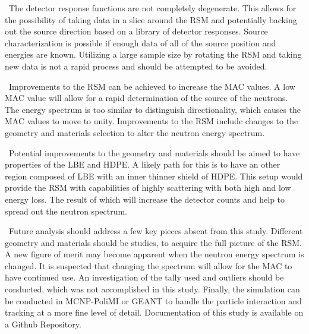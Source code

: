 \documentclass[journal]{IEEEtran}
\let\MYoriglatexcaption\caption
\renewcommand{\caption}[2][\relax]{\MYoriglatexcaption[#2]{#2}}
\begin{document}
	\ The detector response functions are not completely degenerate.  This allows for the possibility of taking data in a slice around the RSM and potentially backing out the source direction based on a library of detector responses.  Source characterization is possible if enough data of all of the source position and energies are known.  Utilizing a large sample size by rotating the RSM and taking new data is not a rapid process and should be attempted to be avoided. 
	
	\ Improvements to the RSM can be achieved to increase the MAC values.  A low MAC value will allow for a rapid determination of the source of the neutrons.  The energy spectrum is too similar to distinguish directionality, which causes the MAC values to move to unity.  Improvements to the RSM include changes to the geometry and materials selection to alter the neutron energy spectrum.  
	
	\ Potential improvements to the geometry and materials should be aimed to have properties of the LBE and HDPE.  A likely path for this is to have an other region composed of LBE with an inner thinner shield of HDPE.  This setup would provide the RSM with capabilities of highly scattering with both high and low energy loss.  The result of which will increase the detector counts and help to spread out the neutron spectrum.  
	
	\ Future analysis should address a few key pieces absent from this study.  Different geometry and materials should be studies, to acquire the full picture of the RSM. A new figure of merit may become apparent when the neutron energy spectrum is changed.  It is suspected that changing the spectrum will allow for the MAC to have continued use.  An investigation of the tally used and outliers should be conducted, which was not accomplished in this study.  Finally, the simulation can be conducted in MCNP-PoliMI or GEANT to handle the particle interaction and tracking at a more fine level of detail.  Documentation of this study is available on a Github Repository\cite{RSMcode}. 
	
	
\end{document}
